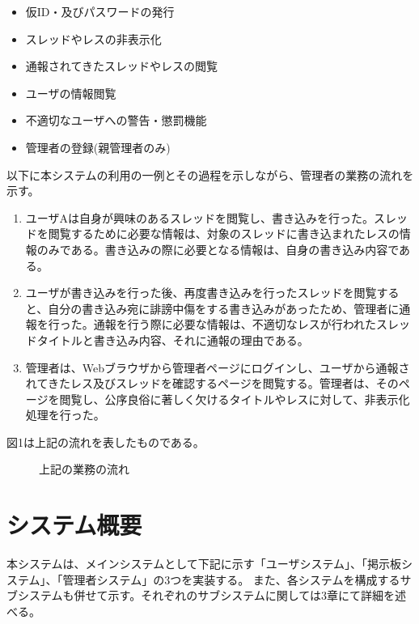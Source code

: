 \documentclass[a4j]{jarticle}
\begin{document}
\begin{itemize}
  \item 仮ID・及びパスワードの発行
  \item スレッドやレスの非表示化
  \item 通報されてきたスレッドやレスの閲覧
  \item ユーザの情報閲覧
  \item 不適切なユーザへの警告・懲罰機能
  \item 管理者の登録(親管理者のみ)
\end{itemize}





以下に本システムの利用の一例とその過程を示しながら、管理者の業務の流れを示す。

\begin{enumerate}
  \item ユーザAは自身が興味のあるスレッドを閲覧し、書き込みを行った。スレッドを閲覧するために必要な情報は、対象のスレッドに書き込まれたレスの情報のみである。書き込みの際に必要となる情報は、自身の書き込み内容である。

  \item  ユーザが書き込みを行った後、再度書き込みを行ったスレッドを閲覧すると、自分の書き込み宛に誹謗中傷をする書き込みがあったため、管理者に通報を行った。通報を行う際に必要な情報は、不適切なレスが行われたスレッドタイトルと書き込み内容、それに通報の理由である。
  \item  管理者は、Webブラウザから管理者ページにログインし、ユーザから通報されてきたレス及びスレッドを確認するページを閲覧する。管理者は、そのページを閲覧し、公序良俗に著しく欠けるタイトルやレスに対して、非表示化処理を行った。
\end{enumerate}

図1は上記の流れを表したものである。


\begin{figure}[H]
\begin{center}
\caption{上記の業務の流れ}
\label{fig:figuretest}
\end{center}
\end{figure}














\section{システム概要}
本システムは、メインシステムとして下記に示す「ユーザシステム」、「掲示板システム」、「管理者システム」の3つを実装する。
 また、各システムを構成するサブシステムも併せて示す。それぞれのサブシステムに関しては3章にて詳細を述べる。
\end{document}
